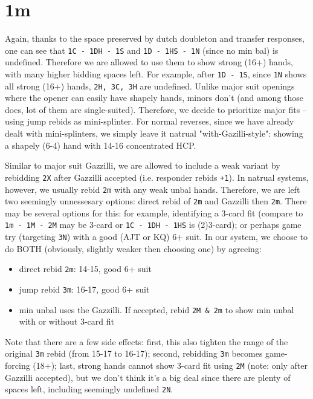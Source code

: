 \section{1m}

Again, thanks to the space preserved by dutch doubleton and transfer responses, one can see that \texttt{1C - 1DH - 1S} and \texttt{1D - 1HS - 1N} (since no min bal) is undefined.
Therefore we are allowed to use them to show strong (16+) hands, with many higher bidding spaces left. 
For example, after \texttt{1D - 1S}, since \texttt{1N} shows all strong (16+) hands, \texttt{2H, 3C, 3H} are undefined. 
Unlike major suit openings where the opener can easily have shapely hands, minors don't (and among those does, lot of them are single-suited). 
Therefore, we decide to prioritize major fits -- using jump rebids as mini-splinter. 
For normal reverses, since we have already dealt with mini-splinters, we simply leave it natrual "with-Gazilli-style": showing a shapely (6-4) hand with 14-16 concentrated HCP.


Similar to major suit Gazzilli, we are allowed to include a weak variant by rebidding \texttt{2X} after Gazzilli accepted (i.e. responder rebids \texttt{+1}).
In natrual systems, however, we usually rebid \texttt{2m} with any weak unbal hands. Therefore, we are left two seemingly unnessesary options: direct rebid of \texttt{2m} and Gazzilli then \texttt{2m}.
There may be several options for this: for example, identifying a 3-card fit (compare to \texttt{1m - 1M - 2M} may be 3-card or \texttt{1C - 1DH - 1HS} is (2)3-card); or perhaps game try (targeting \texttt{3N}) with a good (AJT or KQ) 6+ suit.
In our system, we choose to do BOTH (obviously, slightly weaker then choosing one) by agreeing:
\begin{itemize}
  \setlength\itemsep{0pt}
  \item direct rebid \texttt{2m}: 14-15, good 6+ suit
  \item jump rebid \texttt{3m}: 16-17, good 6+ suit
  \item min unbal uses the Gazzilli. If accepted, rebid \texttt{2M \& 2m} to show min unbal with or without 3-card fit
\end{itemize}
Note that there are a few side effects: first, this also tighten the range of the original \texttt{3m} rebid (from 15-17 to 16-17); 
second, rebidding \texttt{3m} becomes game-forcing (18+); 
last, strong hands cannot show 3-card fit using \texttt{2M} (note: only after Gazzilli accepted), but we don't think it's a big deal since there are plenty of spaces left, including seemingly undefined \texttt{2N}.

